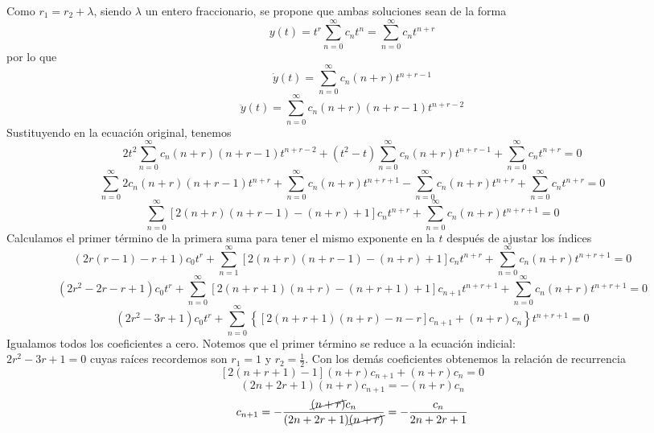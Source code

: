 \documentclass{article}
\begin{document}
\begin{enumerate}
{            Como $r_1=r_2+\lambda$, siendo $\lambda$ un entero fraccionario, se propone que ambas soluciones sean de la
            forma
            $$y(t)=t^r\sum_{n=0}^{\infty}{c_nt^n}=\sum_{n=0}^{\infty}{c_nt^{n+r}}$$
            por lo que
            $$\dot y(t)=\sum_{n=0}^{\infty}{c_n(n+r)t^{n+r-1}}$$
            $$\ddot y(t)=\sum_{n=0}^{\infty}{c_n(n+r)(n+r-1)t^{n+r-2}}$$
            Sustituyendo en la ecuación original, tenemos
            \[
                2t^2\sum_{n=0}^{\infty}{c_n(n+r)(n+r-1)t^{n+r-2}}
                +(t^2-t)\sum_{n=0}^{\infty}{c_n(n+r)t^{n+r-1}}
                +\sum_{n=0}^{\infty}{c_nt^{n+r}} = 0
            \]
            \[
                \sum_{n=0}^{\infty}{2c_n(n+r)(n+r-1)t^{n+r}}
                +\sum_{n=0}^{\infty}{c_n(n+r)t^{n+r+1}}
                -\sum_{n=0}^{\infty}{c_n(n+r)t^{n+r}}
                +\sum_{n=0}^{\infty}{c_nt^{n+r}}=0
            \]
            \[
                \sum_{n=0}^{\infty}{[2(n+r)(n+r-1)-(n+r)+1]c_nt^{n+r}}
                +\sum_{n=0}^{\infty}{c_n(n+r)t^{n+r+1}}=0
            \]
            Calculamos el primer término de la primera suma para tener el mismo exponente en la $t$ después de ajustar
            los índices
            \[
                \left(2r(r-1)-r+1\right)c_0t^r
                +\sum_{n=1}^{\infty}{[2(n+r)(n+r-1)-(n+r)+1]c_nt^{n+r}}
                +\sum_{n=0}^{\infty}{c_n(n+r)t^{n+r+1}}=0
            \]
            \[
                \left(2r^2-2r-r+1\right)c_0t^r
                +\sum_{n=0}^{\infty}{[2(n+r+1)(n+r)-(n+r+1)+1]c_{n+1}t^{n+r+1}}
                +\sum_{n=0}^{\infty}{c_n(n+r)t^{n+r+1}}=0
            \]
            \[
                \left(2r^2-3r+1\right)c_0t^r
                +\sum_{n=0}^{\infty}{
                    \left\{
                        \left[
                            2(n+r+1)(n+r)-n-r
                        \right]c_{n+1}
                        +
                        (n+r)c_n
                    \right\}
                    t^{n+r+1}
                }=0
            \]
            Igualamos todos los coeficientes a cero. Notemos que el primer término se reduce a la ecuación indicial:\\
            $2r^2-3r+1=0$ cuyas raíces recordemos son $r_1=1$ y $r_2=\frac{1}{2}$. Con los demás coeficientes obtenemos
            la relación de recurrencia
            \[
                [2(n+r+1)-1](n+r)c_{n+1}+(n+r)c_n=0
            \]
            \[
                (2n+2r+1)(n+r)c_{n+1}=-(n+r)c_n
            \]
            \[
                c_{n+1}=-\frac{\cancel{(n+r)}c_n}{(2n+2r+1)\cancel{(n+r)}}
                =-\frac{c_n}{2n+2r+1}
\]}
\end{enumerate}
\end{document}
